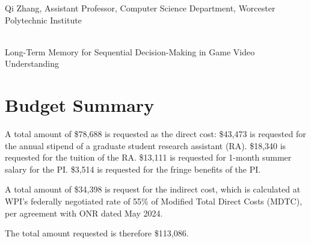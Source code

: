 \documentclass[10pt]{article}
\begin{document}



 Qi Zhang, Assistant Professor, Computer Science Department, Worcester Polytechnic Institute


\\
Long-Term Memory for Sequential Decision-Making in Game Video Understanding


% 
% 

\newpage\clearpage
\section*{Budget Summary}
A total amount of \$78,688 is requested as the direct cost:
\$43,473 is requested for the annual stipend of a graduate student research assistant (RA).
\$18,340 is requested for the tuition of the RA.
\$13,111 is requested for 1-month summer salary for the PI.
\$3,514 is requested for the fringe benefits of the PI.

A total amount of \$34,398 is request for the indirect cost, which is calculated at WPI’s federally negotiated rate of 55\% of Modified Total Direct Costs (MDTC), per agreement with ONR dated May 2024. 

The total amount requested is therefore \$113,086.
\end{document}
